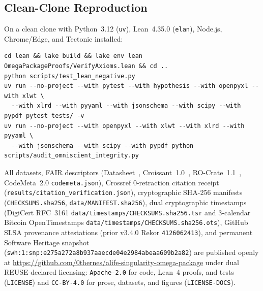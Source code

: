 \documentclass[11pt,reqno]{amsart}
\theoremstyle{plain}
\theoremstyle{definition}
\theoremstyle{remark}
\newcommand{\code}[1]{{\footnotesize\nolinkurl{#1}}}
\begin{document}
\subsection{Clean-Clone Reproduction}
On a clean clone with Python~3.12 (\code{uv}), Lean~4.35.0 (\code{elan}), Node.js, Chrome/Edge, and Tectonic installed:
{\scriptsize
\begin{verbatim}
cd lean && lake build && lake env lean OmegaPackageProofs/VerifyAxioms.lean && cd ..
python scripts/test_lean_negative.py
uv run --no-project --with pytest --with hypothesis --with openpyxl --with xlwt \
  --with xlrd --with pyyaml --with jsonschema --with scipy --with pypdf pytest tests/ -v
uv run --no-project --with openpyxl --with xlwt --with xlrd --with pyyaml \
  --with jsonschema --with scipy --with pypdf python scripts/audit_omniscient_integrity.py
\end{verbatim}
}
All datasets, FAIR descriptors (Datasheet~\cite{gebru2021datasheets}, Croissant~1.0~\cite{akhtar2024croissant}, RO-Crate~1.1~\cite{soilandreyes2022rocrate}, CodeMeta~2.0 \code{codemeta.json}), Crossref 0-retraction citation receipt (\code{results/citation_verification.json}), cryptographic SHA-256 manifests (\code{CHECKSUMS.sha256}, \code{data/MANIFEST.sha256}), dual cryptographic timestamps (DigiCert RFC~3161 \code{data/timestamps/CHECKSUMS.sha256.tsr} and 3-calendar Bitcoin OpenTimestamps \code{data/timestamps/CHECKSUMS.sha256.ots}), GitHub SLSA provenance attestations (prior v3.4.0 Rekor \code{4126062413}), and permanent Software Heritage snapshot (\code{swh:1:snp:e275a272a8b937aaecde04e2984abeaa609b2a82}) are published openly at \url{https://github.com/0thernes/alife-singularity-omega-package} under dual REUSE-declared licensing: \code{Apache-2.0} for code, Lean~4 proofs, and tests (\code{LICENSE}) and \code{CC-BY-4.0} for prose, datasets, and figures (\code{LICENSE-DOCS}).
\end{document}
